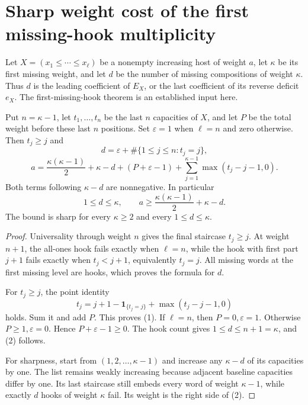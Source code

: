 \section{Sharp weight cost of the first missing-hook multiplicity}
Let $X=(x_1\le\cdots\le x_\ell)$ be a nonempty increasing
host of weight $a$, let $\kappa$ be its first missing weight,
and let $d$ be the number of missing compositions of weight
$\kappa$. Thus $d$ is the leading coefficient of $E_X$,
or the last coefficient of its reverse deficit $e_X$.
The first-missing-hook theorem is an established input here.

\begin{theorem}
Put $n=\kappa-1$, let $t_1,\ldots,t_n$ be the last $n$
capacities of $X$, and let $P$ be the total weight before
these last $n$ positions. Set $\varepsilon=1$ when $\ell=n$
and zero otherwise. Then $t_j\ge j$ and
\[
 d=\varepsilon+\#\{1\le j\le n:t_j=j\},
\]
\[
 a=\frac{\kappa(\kappa-1)}2+\kappa-d
     +(P+\varepsilon-1)
     +\sum_{j=1}^{\kappa-1}\max(t_j-j-1,0).                 \tag{1}
\]
Both terms following $\kappa-d$ are nonnegative. In particular
\[
 1\le d\le\kappa,\qquad
 a\ge\frac{\kappa(\kappa-1)}2+\kappa-d.                    \tag{2}
\]
The bound is sharp for every $\kappa\ge2$ and every
$1\le d\le\kappa$.
\end{theorem}
\begin{proof}
Universality through weight $n$ gives the final staircase
$t_j\ge j$. At weight $n+1$, the all-ones hook fails
exactly when $\ell=n$, while the hook with first part
$j+1$ fails exactly when $t_j<j+1$, equivalently $t_j=j$.
All missing words at the first missing level are hooks,
which proves the formula for $d$.

For $t_j\ge j$, the point identity
\[
 t_j=j+1-\mathbf1_{\{t_j=j\}}+\max(t_j-j-1,0)
\]
holds. Sum it and add $P$. This proves (1).
If $\ell=n$, then $P=0,\varepsilon=1$.
Otherwise $P\ge1,\varepsilon=0$. Hence $P+\varepsilon-1\ge0$.
The hook count gives $1\le d\le n+1=\kappa$, and (2) follows.

For sharpness, start from $(1,2,\ldots,\kappa-1)$ and
increase any $\kappa-d$ of its capacities by one.
The list remains weakly increasing because adjacent
baseline capacities differ by one. Its last staircase
still embeds every word of weight $\kappa-1$, while
exactly $d$ hooks of weight $\kappa$ fail. Its weight is
the right side of (2).
\end{proof}

